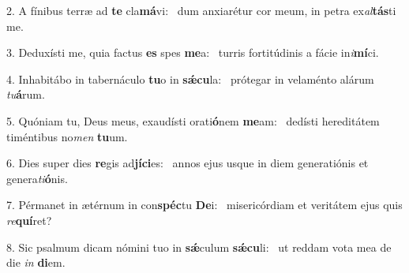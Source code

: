 2. A fínibus terræ ad \textbf{te} cla\textbf{má}vi: \ast\  dum anxiarétur cor meum, in petra ex\textit{al}\textbf{tás}ti me.\

3. Deduxísti me, quia factus \textbf{es} spes \textbf{me}a: \ast\  turris fortitúdinis a fácie in\textit{i}\textbf{mí}ci.\

4. Inhabitábo in tabernáculo \textbf{tu}o in \textbf{sǽ}\textbf{cu}la: \ast\  prótegar in velaménto alárum \textit{tu}\textbf{á}rum.\

5. Quóniam tu, Deus meus, exaudísti orati\textbf{ó}nem \textbf{me}am: \ast\  dedísti hereditátem timéntibus no\textit{men} \textbf{tu}um.\

6. Dies super dies \textbf{re}gis ad\textbf{jí}\textbf{ci}es: \ast\  annos ejus usque in diem generatiónis et genera\textit{ti}\textbf{ó}nis.\

7. Pérmanet in ætérnum in con\textbf{spéc}tu \textbf{De}i: \ast\  misericórdiam et veritátem ejus quis \textit{re}\textbf{quí}ret?\

8. Sic psalmum dicam nómini tuo in \textbf{sǽ}culum \textbf{sǽ}\textbf{cu}li: \ast\  ut reddam vota mea de die \textit{in} \textbf{di}em.\


